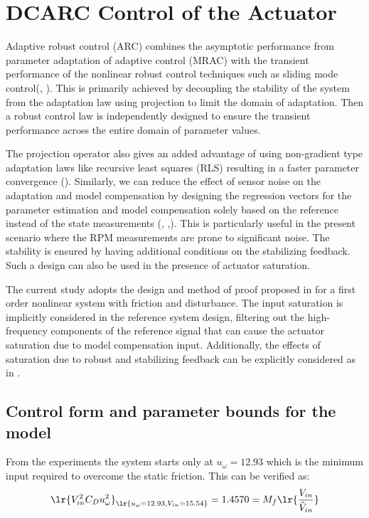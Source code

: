 \chapter{DCARC Control of the Actuator}
Adaptive robust control (ARC) combines the asymptotic performance from parameter adaptation of adaptive control (MRAC)
with the transient performance of the nonlinear robust control techniques such as sliding mode
control(\cite{yao1997adaptive}, \cite{yao2010advanced}). This is primarily achieved by decoupling the stability of the
system from the adaptation law using projection to limit the domain of adaptation. Then a robust control law is
independently designed to ensure the transient performance across the entire domain of parameter values.

The projection operator also gives an added advantage of using non-gradient type adaptation laws like recursive least
squares (RLS) resulting in a faster parameter convergence (\cite{yao2003integrated}). Similarly, we can reduce the
effect of sensor noise on the adaptation and model compensation by designing the regression vectors for the parameter
estimation and model compensation solely based on the reference instead of the state measurements
(\cite{yao1998desired}, \cite{lu2008desired},\cite{hong2007globally}). This is particularly useful in the present
scenario where the RPM measurements are prone to significant noise. The stability is ensured by having additional
conditions on the stabilizing feedback. Such a design can also be used in the presence of actuator saturation.

The current study adopts the design and method of proof proposed in \cite{yao1998desired} for a first order nonlinear
system with friction and disturbance. The input saturation is implicitly considered in the reference system design,
filtering out the high-frequency components of the reference signal that can cause the actuator saturation due to model
compensation input. Additionally, the effects of saturation due to robust and stabilizing feedback can be explicitly
considered as in \cite{hong2007globally}.


\section{Control form and parameter bounds for the model}
From the experiments the system starts only at $u_\omega = 12.93$ which
is the minimum input required to overcome the static friction. This can be
verified as:
\begin{align}
     \lr{V_{in}^2  C_D u_\omega^2 }_{\lr{u_\omega = 12.93, V_{in} = 15.54}} = 1.4570 =  M_f \lr{\frac{V_{in}}{\hat V_{in}}}
\end{align}

